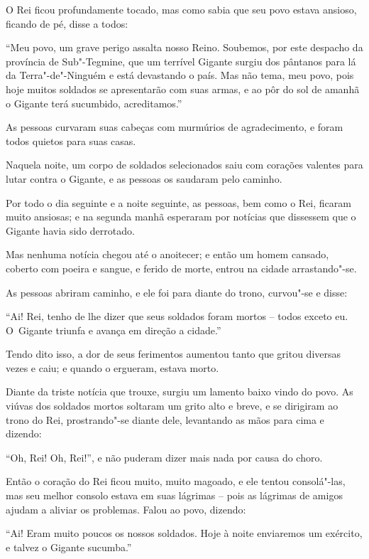 O Rei ficou profundamente tocado, mas como sabia que seu povo estava
ansioso, ficando de pé, disse a todos:

``Meu povo, um grave perigo assalta nosso Reino. Soubemos, por este
despacho da província de Sub"-Tegmine, que um terrível Gigante surgiu dos
pântanos para lá da Terra"-de"-Ninguém e está devastando o país. Mas não
tema, meu povo, pois hoje muitos soldados se apresentarão com suas
armas, e ao pôr do sol de amanhã o Gigante terá sucumbido,
acreditamos.''

As pessoas curvaram suas cabeças com murmúrios de agradecimento, e foram
todos quietos para suas casas.

Naquela noite, um corpo de soldados selecionados saiu com corações
valentes para lutar contra o Gigante, e as pessoas os saudaram pelo
caminho.

\smallskip

Por todo o dia seguinte e a noite seguinte, as pessoas, bem como o Rei,
ficaram muito ansiosas; e na segunda manhã esperaram por notícias que
dissessem que o Gigante havia sido derrotado.

Mas nenhuma notícia chegou até o anoitecer; e então um homem cansado,
coberto com poeira e sangue, e ferido de morte, entrou na cidade
arrastando"-se.

As pessoas abriram caminho, e ele foi para diante do trono, curvou"-se e
disse:

``Ai! Rei, tenho de lhe dizer que seus soldados foram mortos -- todos
exceto eu. O~Gigante triunfa e avança em direção a cidade.''

Tendo dito isso, a dor de seus ferimentos aumentou tanto que gritou
diversas vezes e caiu; e quando o ergueram, estava morto.

Diante da triste notícia que trouxe, surgiu um lamento baixo vindo
do povo. As viúvas dos soldados mortos soltaram um grito alto e breve, e
se dirigiram ao trono do Rei, prostrando"-se diante dele, levantando as
mãos para cima e dizendo:

``Oh, Rei! Oh, Rei!'', e não puderam dizer mais nada por causa do choro.

Então o coração do Rei ficou muito, muito magoado, e ele tentou
consolá"-las, mas seu melhor consolo estava em suas lágrimas -- pois as
lágrimas de amigos ajudam a aliviar os problemas. Falou ao povo,
dizendo:

``Ai! Eram muito poucos os nossos soldados. Hoje à noite enviaremos um
exército, e talvez o Gigante sucumba.''

